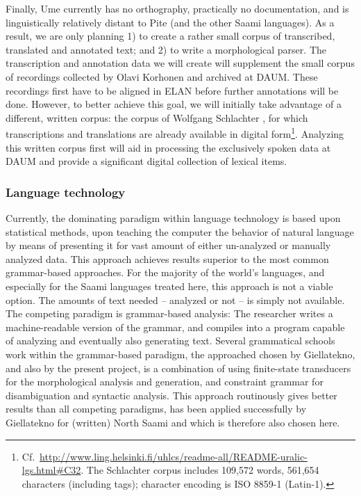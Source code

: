 \documentclass[a4paper,12pt]{article}
\begin{document}
Finally, Ume currently has no orthography, practically no documentation, and is linguistically relatively distant to Pite (and the other Saami languages). As a result, we are only planning 1) to create a rather small corpus of transcribed, translated and annotated text; and 2) to write a morphological parser. The transcription and annotation data we will create will supplement the small corpus of %
recordings collected by Olavi Korhonen and archived at DAUM. These recordings first have to be aligned in ELAN before further annotations will be done. However, to better achieve this goal, we will initially take advantage of a different, written corpus: the corpus of Wolfgang Schlachter%
, for which transcriptions and translations are already available in digital form\footnote{Cf.~\url{http://www.ling.helsinki.fi/uhlcs/readme-all/README-uralic-lgs.html#C32}. The Schlachter corpus includes 109,572 words, 561,654 characters (including tags); character encoding is ISO 8859-1 (Latin-1).}. Analyzing this written corpus first will aid in processing the exclusively spoken data at DAUM and provide a significant digital collection of lexical items.

\subsubsection{Language technology}

Currently, the dominating paradigm within language technology is based upon statistical methods, upon teaching the computer the behavior of natural language by means of presenting it for vast amount of either un-analyzed or manually analyzed data. This approach achieves results superior to the most common grammar-based approaches. For the majority of the world's languages, and especially for the Saami languages treated here, this approach is not a viable option. The amounts of text needed – analyzed or not – is simply not available. The competing paradigm is grammar-based analysis: The researcher writes a machine-readable version of the grammar, and compiles into a program capable of analyzing and eventually also generating text. Several grammatical schools work within the grammar-based paradigm, the approached chosen by Giellatekno, and also by the present project, is a combination of using finite-state transducers for the morphological analysis and generation, and constraint grammar for disambiguation and syntactic analysis. This approach routinously gives better results than all competing paradigms, has been applied successfully by Giellatekno for (written) North Saami and which is therefore also chosen here.
\end{document}
